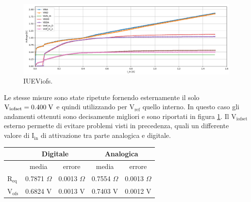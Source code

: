 \begin{figure}
\centering
\includegraphics[scale=.3]{Immagini/IUEViofs2}
\caption{IUEViofs.}
\label{IUEViofs}
\end{figure}
Le stesse misure sono state ripetute fornendo esternamente il solo $\mathrm{V_{iofset}}=0.400 \rm \; V$ e quindi utilizzando per $\mathrm{V_{ref}}$ quello interno. In questo caso gli andamenti ottenuti sono decisamente migliori e sono riportati in figura \ref{IUEViofs}. 
Il $\mathrm{V_{iofset}}$ esterno permette di evitare problemi visti in precedenza, quali un differente valore di $\mathrm{I_{in}}$ di attivazione tra parte analogica e digitale.  
\begin{center}
\begin{tabular}{|l|c|c|c|c|}
\hline
 & \multicolumn{2}{c|}{Digitale} & \multicolumn{2}{c|}{Analogica} \\ \hline
 
& media & errore & media & errore \\ \hline

$\mathrm{R_{eq}}$ & 0.7871 $\Omega$ & 0.0013 $\Omega$& 0.7554 $\Omega$ & 0.0013 $\Omega$ \\ \hline
$\mathrm{V_{ofs}}$ & 0.6824 V& 0.0013 V & 0.7403 V & 0.0012 V\\ \hline     

\end{tabular}
\end{center}


% 
%


